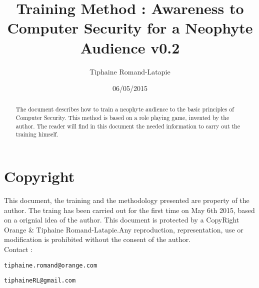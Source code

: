 \documentclass[11pt]{article} %
\title{Training Method : Awareness to Computer Security for a Neophyte Audience v0.2}
\author{Tiphaine Romand-Latapie}
\date{06/05/2015} %
\begin{document}
\maketitle

\begin{abstract}
The document describes how to train a neophyte audience to the
basic principles of Computer Security. This method is based on a
role playing game, invented by the author. The reader will find in
this document the needed information to carry out the training
himself.
\end{abstract}

\section{Copyright}
This document, the training and the methodology presented are
property of the author. The traing has been carried out for the
first time on May 6th 2015, based on a orignial idea of the
author. This document is protected by a CopyRight Orange \&
Tiphaine Romand-Latapie.Any reproduction, representation, use or
modification is prohibited without the consent of the author.
\\
Contact : 
\begin{verbatim}tiphaine.romand@orange.com\end{verbatim}
\begin{verbatim}tiphaineRL@gmail.com\end{verbatim}
\end{document}
